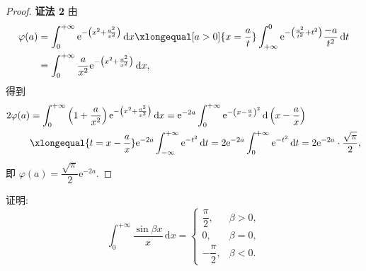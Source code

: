 \begin{proof}
\textbf{证法 2} 由
\[
  \begin{aligned}
    \varphi(a)&=\int_{0}^{+\infty}\mathrm{e}^{-\left(x^{2}+\frac{a^{2}}{x^{2}}\right)}\,\mathrm{d}x\xlongequal[a>0]{x=\frac{a}{t}}\int_{+\infty}^{0}\mathrm{e}^{-\left(\frac{a^{2}}{t^{2}}+t^{2}\right)}\frac{-a}{t^{2}}\,\mathrm{d}t\\
    &=\int_{0}^{+\infty}\frac{a}{x^{2}}\mathrm{e}^{-\left(x^{2}+\frac{a^{2}}{x^{2}}\right)}\,\mathrm{d}x,
  \end{aligned}
\]
得到
\[
  \begin{aligned}
    2\varphi(a)&=\int_{0}^{+\infty}\left(1+\frac{a}{x^{2}}\right)\mathrm{e}^{-\left(x^{2}+\frac{a^{2}}{x^{2}}\right)}\,\mathrm{d}x=\mathrm{e}^{-2a}\int_{0}^{+\infty}\mathrm{e}^{-\left(x-\frac{a}{x}\right)^{2}}\,\mathrm{d}\left(x-\frac{a}{x}\right)\\
    &\xlongequal{t=x-\frac{a}{x}}\mathrm{e}^{-2a}\int_{-\infty}^{+\infty}\mathrm{e}^{-t^{2}}\,\mathrm{d}t=2\mathrm{e}^{-2a}\int_{0}^{+\infty}\mathrm{e}^{-t^{2}}\,\mathrm{d}t=2\mathrm{e}^{-2a}\cdot\frac{\sqrt{\pi}}{2},
  \end{aligned}
\]
即 $\varphi(a)=\dfrac{\sqrt{\pi}}{2}\mathrm{e}^{-2a}$.
\end{proof}

\begin{example}\label{ex:15.3.8}
证明:
\[
  \int_{0}^{+\infty}\frac{\sin\beta x}{x}\,\mathrm{d}x=\begin{cases}
    \dfrac{\pi}{2}, & \beta>0,\\
    0, & \beta=0,\\
    -\dfrac{\pi}{2}, & \beta<0.
\end{cases}
\]
\end{example}

